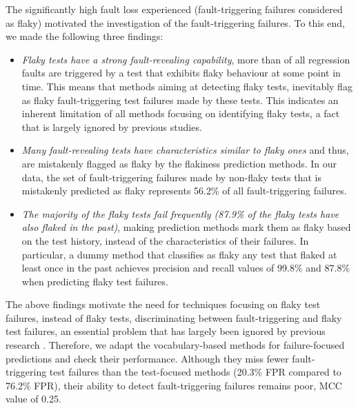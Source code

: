 The %
significantly  high fault loss experienced (fault-triggering failures considered as flaky) motivated the investigation of the fault-triggering failures. To this end, we made the following three findings: 
\begin{itemize}
    \item \textit{Flaky tests have a strong fault-revealing capability}, \ie more than  of all regression faults are triggered by a test that exhibits flaky behaviour at some point in time. This means that methods aiming at detecting flaky tests, inevitably flag as flaky fault-triggering test failures made by these tests. This indicates an inherent limitation of all methods focusing on identifying flaky tests, a fact that is largely ignored by previous studies.
    
    \item \textit{Many fault-revealing tests have characteristics similar to flaky ones} and thus, are mistakenly flagged as flaky by the flakiness prediction methods. %
    In our data, the set of fault-triggering failures made by non-flaky tests that is mistakenly predicted as flaky represents 56.2\% of all fault-triggering failures. 

    \item \textit{The majority of the flaky tests fail frequently (87.9\% of the flaky tests have also flaked in the past)}, making prediction methods mark them as flaky based on the test history, instead of the characteristics of their failures. In particular, a dummy method that classifies as flaky any test that flaked at least once in the past achieves precision and recall values of 99.8\% and 87.8\% when predicting flaky test failures.%
\end{itemize}

The above findings motivate the need for techniques focusing on flaky test failures, instead of flaky tests, \ie discriminating between fault-triggering and flaky test failures, an essential problem that has largely been ignored by previous research \cite{Parry2021}. Therefore, we adapt the vocabulary-based methods for failure-focused predictions and check their performance. Although they miss fewer fault-triggering test failures than the test-focused methods (20.3\% FPR compared to 76.2\% FPR), their ability to detect fault-triggering failures remains poor, MCC value of 0.25. 

